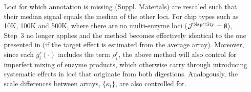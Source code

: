 \documentclass{bioinfo}
\newcommand{\Nsp}{\ensuremath{\textnormal{Nsp}}\xspace}
\newcommand{\Sty}{\ensuremath{\textnormal{Sty}}\xspace}
\begin{document}

Loci for which annotation is missing (Suppl. Materials) are rescaled such that their median signal equals the median of the other loci.
For chip types such as 10K, 100K and 500K, where there are no multi-enzyme loci ($\mathcal{J}^{\Nsp\cap\Sty} = \emptyset$), Step~3 no longer applies and the method becomes effectively identical to the one presented in \citet{BengtssonH_etal_2008} (if the target effect is estimated from the average array).
Moreover, since each $g^{r}_{i}(\cdot)$ includes the term $\rho^{r}_{i}$, the above method will also control for imperfect mixing of enzyme products, which otherwise carry through introducing systematic effects in loci that originate from both digestions.
Analogously, the scale differences between arrays, $\{\kappa_i\}$, are also controlled for.

\end{document}
